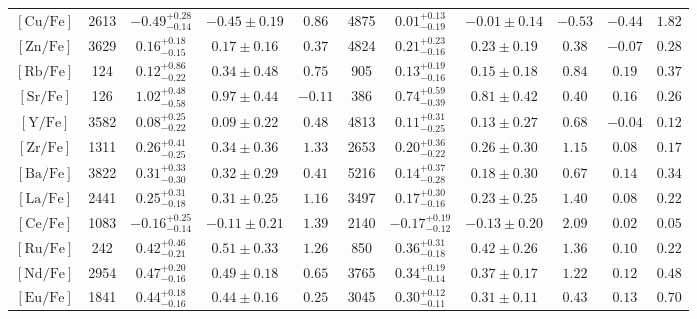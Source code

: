\begin{table*}
\begin{tabular}{c|cccc|cccc|cc}
$\mathrm{[Cu/Fe]}$ & 2613 & $-0.49_{-0.14}^{+0.28}$ & $-0.45 \pm 0.19$ & $0.86$ & 4875 & $0.01_{-0.19}^{+0.13}$ & $-0.01 \pm 0.14$ & $-0.53$ & $-0.44$ & $1.82$  \\
$\mathrm{[Zn/Fe]}$ & 3629 & $0.16_{-0.15}^{+0.18}$ & $0.17 \pm 0.16$ & $0.37$ & 4824 & $0.21_{-0.16}^{+0.23}$ & $0.23 \pm 0.19$ & $0.38$ & $-0.07$ & $0.28$  \\
\hline
$\mathrm{[Rb/Fe]}$ & 124 & $0.12_{-0.22}^{+0.86}$ & $0.34 \pm 0.48$ & $0.75$ & 905 & $0.13_{-0.16}^{+0.19}$ & $0.15 \pm 0.18$ & $0.84$ & $0.19$ & $0.37$  \\
$\mathrm{[Sr/Fe]}$ & 126 & $1.02_{-0.58}^{+0.48}$ & $0.97 \pm 0.44$ & $-0.11$ & 386 & $0.74_{-0.39}^{+0.59}$ & $0.81 \pm 0.42$ & $0.40$ & $0.16$ & $0.26$  \\
$\mathrm{[Y/Fe]}$ & 3582 & $0.08_{-0.22}^{+0.25}$ & $0.09 \pm 0.22$ & $0.48$ & 4813 & $0.11_{-0.25}^{+0.31}$ & $0.13 \pm 0.27$ & $0.68$ & $-0.04$ & $0.12$  \\
$\mathrm{[Zr/Fe]}$ & 1311 & $0.26_{-0.25}^{+0.41}$ & $0.34 \pm 0.36$ & $1.33$ & 2653 & $0.20_{-0.22}^{+0.36}$ & $0.26 \pm 0.30$ & $1.15$ & $0.08$ & $0.17$  \\
$\mathrm{[Ba/Fe]}$ & 3822 & $0.31_{-0.30}^{+0.33}$ & $0.32 \pm 0.29$ & $0.41$ & 5216 & $0.14_{-0.28}^{+0.37}$ & $0.18 \pm 0.30$ & $0.67$ & $0.14$ & $0.34$  \\
$\mathrm{[La/Fe]}$ & 2441 & $0.25_{-0.18}^{+0.31}$ & $0.31 \pm 0.25$ & $1.16$ & 3497 & $0.17_{-0.16}^{+0.30}$ & $0.23 \pm 0.25$ & $1.40$ & $0.08$ & $0.22$  \\
$\mathrm{[Ce/Fe]}$ & 1083 & $-0.16_{-0.14}^{+0.25}$ & $-0.11 \pm 0.21$ & $1.39$ & 2140 & $-0.17_{-0.12}^{+0.19}$ & $-0.13 \pm 0.20$ & $2.09$ & $0.02$ & $0.05$  \\
\hline
$\mathrm{[Ru/Fe]}$ & 242 & $0.42_{-0.21}^{+0.46}$ & $0.51 \pm 0.33$ & $1.26$ & 850 & $0.36_{-0.18}^{+0.31}$ & $0.42 \pm 0.26$ & $1.36$ & $0.10$ & $0.22$  \\
$\mathrm{[Nd/Fe]}$ & 2954 & $0.47_{-0.16}^{+0.20}$ & $0.49 \pm 0.18$ & $0.65$ & 3765 & $0.34_{-0.14}^{+0.19}$ & $0.37 \pm 0.17$ & $1.22$ & $0.12$ & $0.48$  \\
$\mathrm{[Eu/Fe]}$ & 1841 & $0.44_{-0.16}^{+0.18}$ & $0.44 \pm 0.16$ & $0.25$ & 3045 & $0.30_{-0.11}^{+0.12}$ & $0.31 \pm 0.11$ & $0.43$ & $0.13$ & $0.70$  \\
\hline
\end{tabular}
\end{table*}
\endgroup
